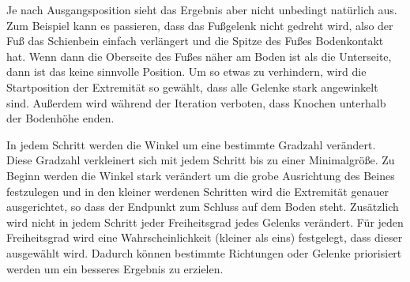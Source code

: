 Je nach Ausgangsposition sieht das Ergebnis aber nicht unbedingt natürlich aus. Zum Beispiel kann es passieren, dass das Fußgelenk nicht gedreht wird, also der Fuß das Schienbein einfach verlängert und die Spitze des Fußes Bodenkontakt hat. Wenn dann die Oberseite des Fußes näher am Boden ist als die Unterseite, dann ist das keine sinnvolle Position.
Um so etwas zu verhindern, wird die Startposition der Extremität so gewählt, dass alle Gelenke stark angewinkelt sind. 
Außerdem wird während der Iteration verboten, dass Knochen unterhalb der Bodenhöhe enden.

In jedem Schritt werden die Winkel um eine bestimmte Gradzahl verändert. Diese Gradzahl verkleinert sich mit jedem Schritt bis zu einer Minimalgröße. Zu Beginn werden die Winkel stark verändert um die grobe Ausrichtung des Beines festzulegen und in den kleiner werdenen Schritten wird die Extremität genauer ausgerichtet, so dass der Endpunkt zum Schluss auf dem Boden steht. 
Zusätzlich wird nicht in jedem Schritt jeder Freiheitsgrad jedes Gelenks verändert. Für jeden Freiheitsgrad wird eine Wahrscheinlichkeit (kleiner als eins) festgelegt, dass dieser ausgewählt wird. Dadurch können bestimmte Richtungen oder Gelenke priorisiert werden um ein besseres Ergebnis zu erzielen. 

